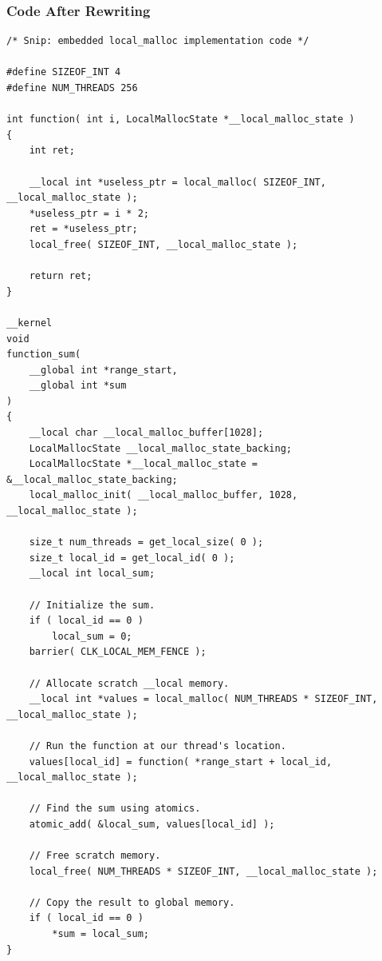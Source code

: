 \documentclass{article}
\begin{document}
\subsubsection{Code After Rewriting}
\begin{lstlisting}
/* Snip: embedded local_malloc implementation code */

#define SIZEOF_INT 4
#define NUM_THREADS 256

int function( int i, LocalMallocState *__local_malloc_state )
{
    int ret;

    __local int *useless_ptr = local_malloc( SIZEOF_INT, __local_malloc_state );
    *useless_ptr = i * 2;
    ret = *useless_ptr;
    local_free( SIZEOF_INT, __local_malloc_state );

    return ret;
}

__kernel
void
function_sum(
    __global int *range_start,
    __global int *sum
)
{
    __local char __local_malloc_buffer[1028];
    LocalMallocState __local_malloc_state_backing;
    LocalMallocState *__local_malloc_state = &__local_malloc_state_backing;
    local_malloc_init( __local_malloc_buffer, 1028, __local_malloc_state );

    size_t num_threads = get_local_size( 0 );
    size_t local_id = get_local_id( 0 );
    __local int local_sum;

    // Initialize the sum.
    if ( local_id == 0 )
        local_sum = 0;
    barrier( CLK_LOCAL_MEM_FENCE );

    // Allocate scratch __local memory.
    __local int *values = local_malloc( NUM_THREADS * SIZEOF_INT, __local_malloc_state );

    // Run the function at our thread's location.
    values[local_id] = function( *range_start + local_id, __local_malloc_state );

    // Find the sum using atomics.
    atomic_add( &local_sum, values[local_id] );

    // Free scratch memory.
    local_free( NUM_THREADS * SIZEOF_INT, __local_malloc_state );

    // Copy the result to global memory.
    if ( local_id == 0 )
        *sum = local_sum;
}
\end{lstlisting}
\end{document}
